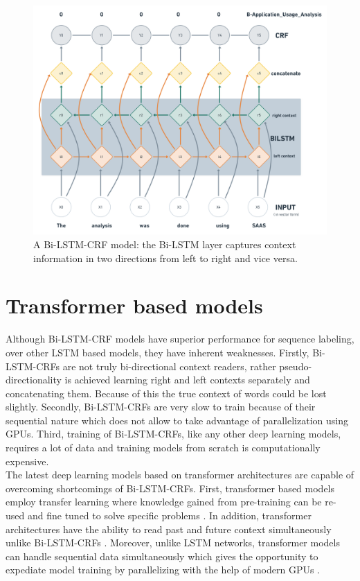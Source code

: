 \begin{figure}[htbp]
	\centering
	\includegraphics[width=.85\textwidth]{4.graphics/figures/ch_5/Bi-LSTM-CRF}
	\caption{A \ac{Bi-LSTM-CRF} model: the \ac{Bi-LSTM} layer captures context information in two directions from left to right and vice versa. }
	\label{fig:chapter03:setup}
\end{figure}

\section{Transformer based models}
\label{sec:chapter05:DLModels:Transformer}

Although Bi-LSTM-CRF models have superior performance for sequence labeling, over other LSTM based models, they have inherent weaknesses. Firstly, Bi-LSTM-CRFs are not truly bi-directional context readers, rather  pseudo-directionality is achieved learning right and left contexts separately and concatenating them. Because of this the true context of words could be lost slightly. Secondly, Bi-LSTM-CRFs are very slow to train because of their sequential nature which does not allow to take  advantage of parallelization using \ac{GPU}s.  Third, training of Bi-LSTM-CRFs, like any other deep learning models, requires a lot of data and training models from scratch is computationally expensive. \\


The latest deep learning models based on transformer architectures are capable of overcoming shortcomings of Bi-LSTM-CRFs. First, transformer based models employ transfer learning where knowledge gained from pre-training can be re-used and fine tuned to solve specific problems \citep{ezen2020comparison}. In addition, transformer architectures have the ability to read past and future context simultaneously unlike Bi-LSTM-CRFs \citep{devlin2018bert}. Moreover, unlike LSTM networks, transformer models can handle sequential data simultaneously which gives the opportunity to expediate model training by parallelizing with the help of modern \ac{GPU}s \citep{ezen2020comparison}. 

